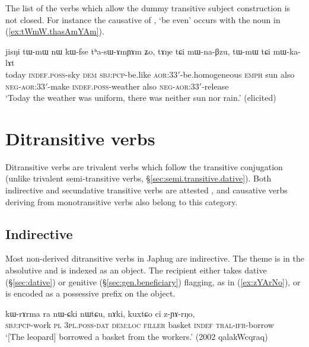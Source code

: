 The list of the verbs which allow the dummy transitive subject construction is not closed. For instance the causative of , `be even' occurs with the noun  in (\ref{ex:tWmW.thasAmYAm}).

\begin{exe}
\ex \label{ex:tWmW.thasAmYAm}
\gll  jisŋi tɯ-mɯ nɯ kɯ-fse tʰa-sɯ-ɤmɲɤm ʑo, tɤŋe tɕi mɯ-na-βzu, tɯ-mɯ tɕi mɯ-ka-lɤt \\
today \textsc{indef}.\textsc{poss}-sky \textsc{dem} \textsc{sbj}:\textsc{pcp}-be.like \textsc{aor}:3\fl{}3$'$-be.homogeneous \textsc{emph} sun also \textsc{neg}-\textsc{aor}:3\fl{}3$'$-make  \textsc{indef}.\textsc{poss}-weather also \textsc{neg}-\textsc{aor}:3\fl{}3$'$-release \\ 
\glt  `Today the weather was uniform, there was neither sun nor rain.' (elicited)
\end{exe}

\section{Ditransitive verbs} \label{sec:ditransitive}
Ditransitive verbs are trivalent verbs which follow the transitive conjugation (unlike trivalent semi-transitive verbs, §\ref{sec:semi.transitive.dative}). Both indirective and secundative transitive verbs are attested \citep{malchukov10ditransitive}, and causative verbs deriving from monotransitive verbs also belong to this category.


\subsection{Indirective} \label{sec:ditransitive.indirective}
Most non-derived ditransitive verbs in Japhug are indirective. The theme is in the absolutive and is indexed as an object. The recipient either takes dative (§\ref{sec:dative}) or genitive (§\ref{sec:gen.beneficiary}) flagging, as in (\ref{ex:zYArNo}), or is encoded as a possessive prefix on the object.

\begin{exe}
	\ex \label{ex:zYArNo}
	\gll kɯ-rɤrma ra nɯ-ɕki nɯtɕu, nɤki, kuxtɕo ci z-ɲɤ-rŋo, \\
	\textsc{sbj}:\textsc{pcp}-work \textsc{pl} \textsc{3pl}.\textsc{poss}-\textsc{dat} \textsc{dem}:\textsc{loc} \textsc{filler} basket \textsc{indef} \textsc{tral}-\textsc{ifr}-borrow \\
	\glt  `[The leopard] borrowed a basket from the workers.' (2002 qalakWcqraq)
\end{exe}


